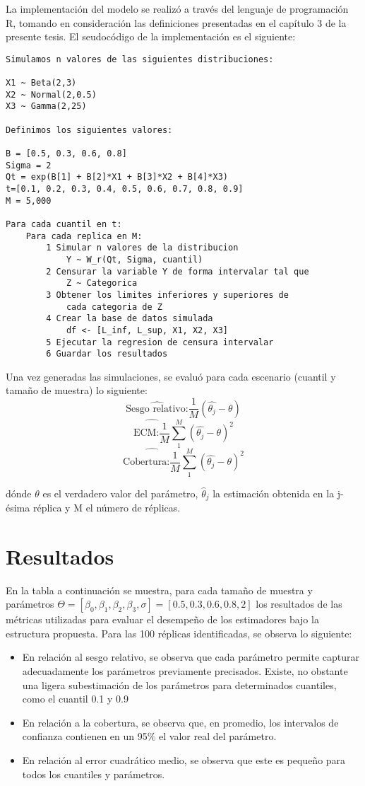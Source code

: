 La implementación del modelo se realizó a través del lenguaje de programación R, tomando en consideración las definiciones presentadas en el capítulo 3 de la presente tesis. El seudocódigo de la implementación es el siguiente:

\begin{lstlisting}
Simulamos n valores de las siguientes distribuciones:

X1 ~ Beta(2,3) 
X2 ~ Normal(2,0.5)
X3 ~ Gamma(2,25)

Definimos los siguientes valores:

B = [0.5, 0.3, 0.6, 0.8] 
Sigma = 2
Qt = exp(B[1] + B[2]*X1 + B[3]*X2 + B[4]*X3)
t=[0.1, 0.2, 0.3, 0.4, 0.5, 0.6, 0.7, 0.8, 0.9]
M = 5,000

Para cada cuantil en t:
	Para cada replica en M:
		1 Simular n valores de la distribucion 
			Y ~ W_r(Qt, Sigma, cuantil)
		2 Censurar la variable Y de forma intervalar tal que
			Z ~ Categorica
		3 Obtener los limites inferiores y superiores de
			cada categoria de Z
		4 Crear la base de datos simulada
			df <- [L_inf, L_sup, X1, X2, X3]
		5 Ejecutar la regresion de censura intervalar
		6 Guardar los resultados
\end{lstlisting}


Una vez generadas las simulaciones, se evaluó para cada escenario (cuantil y tamaño de muestra) lo siguiente:
\[ \hat{\text{Sesgo relativo:}} \frac{1}{M}(\hat{\theta_j} - \theta)\]
\[ \hat{\text{ECM:} \frac{1}{M}} \sum_1^M (\hat{\theta_j} - \theta)^2 \]
\[ \hat{\text{Cobertura:} \frac{1}{M}} \sum_1^M (\hat{\theta_j} - \theta)^2 \]

\noindent dónde $\theta$ es el verdadero valor del parámetro, $\hat{\theta}_{j}$ la estimación obtenida en la j-ésima réplica y M el número de réplicas.

\section{Resultados}

En la tabla a continuación se muestra, para cada tamaño de muestra y parámetros $\Theta = [\beta_0,\beta_1,\beta_2,\beta_3,\sigma] = [0.5, 0.3, 0.6, 0.8, 2]$ los resultados de las métricas utilizadas para evaluar el desempeño de los estimadores bajo la estructura propuesta. Para las 100 réplicas identificadas, se observa lo siguiente:

\begin{itemize}
	\item En relación al sesgo relativo, se observa que cada parámetro permite capturar adecuadamente los parámetros previamente precisados. Existe, no obstante una ligera subestimación de los parámetros para determinados cuantiles, como el cuantil 0.1 y 0.9
	\item En relación a la cobertura, se observa que, en promedio, los intervalos de confianza contienen en un 95\% el valor real del parámetro.
	\item En relación al error cuadrático medio, se observa que este es pequeño para todos los cuantiles y parámetros.
\end{itemize}

